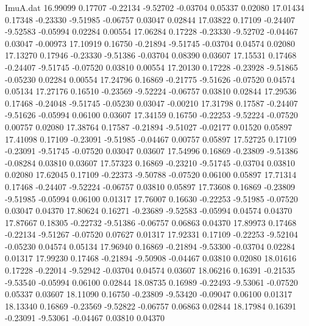 \begin{filecontents}{ImuA.dat}
  16.99099    0.17707   -0.22134   -9.52702   -0.03704    0.05337    0.02080
  17.01434    0.17348   -0.23330   -9.51985   -0.06757    0.03047    0.02844
  17.03822    0.17109   -0.24407   -9.52583   -0.05994    0.02284    0.00554
  17.06284    0.17228   -0.23330   -9.52702   -0.04467    0.03047   -0.00973
  17.10919    0.16750   -0.21894   -9.51745   -0.03704    0.04574    0.02080
  17.13270    0.17946   -0.23330   -9.51386   -0.03704    0.08390    0.03607
  17.15531    0.17468   -0.24407   -9.51745   -0.07520    0.03810    0.00554
  17.20130    0.17228   -0.23928   -9.51865   -0.05230    0.02284    0.00554
  17.24796    0.16869   -0.21775   -9.51626   -0.07520    0.04574    0.05134
  17.27176    0.16510   -0.23569   -9.52224   -0.06757    0.03810    0.02844
  17.29536    0.17468   -0.24048   -9.51745   -0.05230    0.03047   -0.00210
  17.31798    0.17587   -0.24407   -9.51626   -0.05994    0.06100    0.03607
  17.34159    0.16750   -0.22253   -9.52224   -0.07520    0.00757    0.02080
  17.38764    0.17587   -0.21894   -9.51027   -0.02177    0.01520    0.05897
  17.41098    0.17109   -0.23091   -9.51985   -0.04467    0.00757    0.05897
  17.52725    0.17109   -0.23091   -9.51745   -0.07520    0.03047    0.03607
  17.54996    0.16869   -0.23809   -9.51386   -0.08284    0.03810    0.03607
  17.57323    0.16869   -0.23210   -9.51745   -0.03704    0.03810    0.02080
  17.62045    0.17109   -0.22373   -9.50788   -0.07520    0.06100    0.05897
  17.71314    0.17468   -0.24407   -9.52224   -0.06757    0.03810    0.05897
  17.73608    0.16869   -0.23809   -9.51985   -0.05994    0.06100    0.01317
  17.76007    0.16630   -0.22253   -9.51985   -0.07520    0.03047    0.04370
  17.80624    0.16271   -0.23689   -9.52583   -0.05994    0.04574    0.04370
  17.87667    0.18305   -0.22732   -9.51386   -0.06757    0.06863    0.04370
  17.89973    0.17468   -0.22134   -9.51267   -0.07520    0.07627    0.01317
  17.92331    0.17109   -0.22253   -9.52104   -0.05230    0.04574    0.05134
  17.96940    0.16869   -0.21894   -9.53300   -0.03704    0.02284    0.01317
  17.99230    0.17468   -0.21894   -9.50908   -0.04467    0.03810    0.02080
  18.01616    0.17228   -0.22014   -9.52942   -0.03704    0.04574    0.03607
  18.06216    0.16391   -0.21535   -9.53540   -0.05994    0.06100    0.02844
  18.08735    0.16989   -0.22493   -9.53061   -0.07520    0.05337    0.03607
  18.11090    0.16750   -0.23809   -9.53420   -0.09047    0.06100    0.01317
  18.13340    0.16869   -0.23569   -9.52822   -0.06757    0.06863    0.02844
  18.17984    0.16391   -0.23091   -9.53061   -0.04467    0.03810    0.04370

\end{filecontents}
